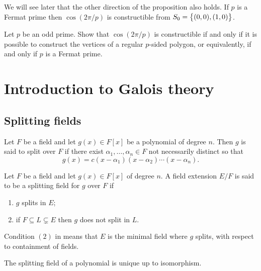 \documentclass[11pt,a4paper]{article}
\begin{document}
\begin{remark}
  We will see later that the other direction of the proposition also holds.
  If $p$ is a Fermat prime then $\cos(2\pi/p)$ is constructible
  from $S_0 = \left\{(0,0),(1,0)\right\}$.
\end{remark}

\begin{exercise}
  Let $p$ be an odd prime.
  Show that $\cos(2\pi/p)$ is constructible if and only if
  it is possible to construct the vertices of a regular $p$-sided polygon,
  or equivalently, if and only if $p$ is a Fermat prime.
\end{exercise}

\newpage

\section{Introduction to Galois theory}
\subsection{Splitting fields}

\begin{definition}
  Let $F$ be a field and let $g(x) \in F[x]$ be a polynomial of degree $n$.
  Then $g$ is said to split over $F$ if there exist
  $\alpha_1,\dots,\alpha_n \in F$
  not necessarily distinct so that
  \[
    g(x) = c (x - \alpha_1) (x - \alpha_2) \cdots (x - \alpha_n).
  \]
\end{definition}

\begin{definition}
  \label{def:splitting-field}
  Let $F$ be a field and let $g(x) \in F[x]$ of degree $n$.
  A field extension $E/F$ is said to be a splitting field for $g$
  over $F$ if
  \begin{enumerate}
    \item[(1)] $g$ splits in $E$;
    \item[(2)] if $F \subseteq L \subsetneq E$ then $g$ does not split
      in $L$.
  \end{enumerate}
\end{definition}
\begin{remark}
  Condition $(2)$ in  means that $E$ is the minimal
  field where $g$ splits, with respect to containment of fields.
\end{remark}

\begin{remark}
  The splitting field of a polynomial is unique up to isomorphism.
\end{remark}
\end{document}

